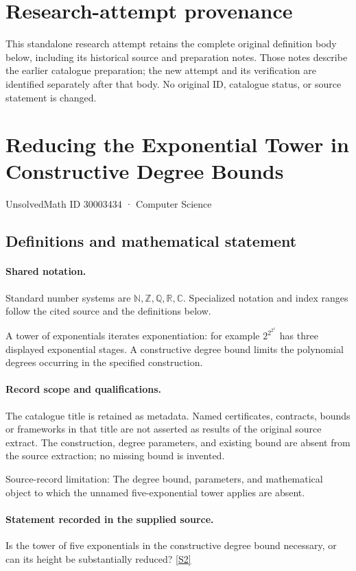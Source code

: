 \documentclass[11pt]{article}
\begin{document}
\section*{Research-attempt provenance}
This standalone research attempt retains the complete original definition body below,
including its historical source and preparation notes. Those notes describe the
earlier catalogue preparation; the new attempt and its verification are identified
separately after that body. No original ID, catalogue status, or source statement is changed.

\section{Reducing the Exponential Tower in Constructive Degree Bounds}\label{30003434}
{\small UnsolvedMath ID 30003434 · Computer Science}
\subsection{Definitions and mathematical statement}

\paragraph{Shared notation.}Standard number systems are $\mathbb N,\mathbb Z,\mathbb Q,\mathbb R,\mathbb C$. Specialized notation and index ranges follow the cited source and the definitions below.


A tower of exponentials iterates exponentiation: for example $2^{2^{2^x}}$ has three displayed exponential stages. A constructive degree bound limits the polynomial degrees occurring in the specified construction.
\paragraph{Record scope and qualifications.}
The catalogue title is retained as metadata. Named certificates, contracts, bounds or frameworks in that title are not asserted as results of the original source extract.
The construction, degree parameters, and existing bound are absent from the source extraction; no missing bound is invented.

Source-record limitation: The degree bound, parameters, and mathematical object to which the unnamed five-exponential tower applies are absent.
\paragraph{Statement recorded in the supplied source.}
Is the tower of five exponentials in the constructive degree bound necessary, or can its height be substantially reduced? \href{https://doi.org/10.4171/owr/2017/14}{[S2]}
\end{document}
